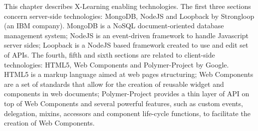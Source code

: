 This chapter describes X-Learning enabling technologies.
The first three sections concern server-side technologies: MongoDB, NodeJS and Loopback by Strongloop (an IBM company). MongoDB is a NoSQL document-oriented database management system; NodeJS is an event-driven framework to handle Javascript server sides; Loopback is a NodeJS based framework created to use and edit set of APIs.
The fourth, fifth and sixth sections are related to client-side technologies: HTML5, Web Components and Polymer-Project by Google. HTML5 is a markup language aimed at web pages structuring; Web Components are a set of standards that allow for the creation of reusable widget and components in  web  documents;  Polymer-Project provides a thin layer  of API on top of Web Components and several powerful features, such as custom events, delegation, mixins, accessors and component life-cycle functions, to facilitate the creation of Web  Components.
